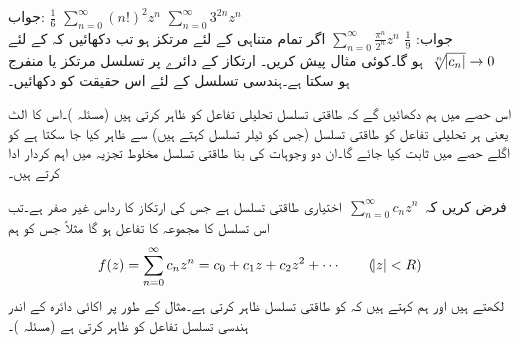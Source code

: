 جواب:\quad
$\tfrac{1}{6}$
\quad
$\sum\limits_{n=0}^{\infty} (n!)^2 z^n$
\quad
$\sum\limits_{n=0}^{\infty} 3^{2n}z^n$\\
جواب:\quad
$\tfrac{1}{9}$
\quad
$\sum\limits_{n=0}^{\infty} \tfrac{\pi^n}{2^n}z^n$
\quad
اگر  تمام متناہی  کے لئے مرتکز ہو تب دکھائیں کہ  کے لئے 
$\,\sqrt[\leftroot{-2}n]{\abs{c_n}}\to 0\,$
ہو گا۔کوئی مثال پیش کریں۔
\quad
ارتکاز کے دائرے پر تسلسل مرتکز یا منفرج ہو سکتا ہے۔ہندسی تسلسل کے لئے اس حقیقت کو دکھائیں۔

اس حصے میں ہم دکھائیں گے کہ طاقتی تسلسل تحلیلی تفاعل کو ظاہر کرتی ہیں (مسئلہ )۔اس کا الٹ یعنی ہر تحلیلی تفاعل کو طاقتی تسلسل (جس کو ٹیلر تسلسل کہتے ہیں) سے ظاہر کیا جا سکتا ہے کو اگلے حصے میں ثابت کیا جائے گا۔ان دو وجوہات کی بنا طاقتی تسلسل مخلوط تجزیہ میں اہم کردار ادا کرتے ہیں۔

فرض کریں کہ 
$\,\sum_{n=0}^{\infty}c_nz^n\,$
اختیاری طاقتی تسلسل ہے جس کی ارتکاز کا رداس  غیر صفر ہے۔تب اس تسلسل کا مجموعہ  کا تفاعل ہو گا مثلاً  جس کو ہم
\begin{align}\label{مساوات_ٹیلر_طاقتی_تسلسل_اور_تحلیلی_تفاعل_الف}
f(z)=\sum\limits_{n=0}^{\infty} c_nz^n =c_0+c_1z+c_2z^2+\cdots\quad\quad (\abs{z}<R)
\end{align}
لکھتے ہیں اور ہم کہتے ہیں کہ  کو طاقتی تسلسل ظاہر کرتی ہے۔مثال کے طور پر اکائی دائرہ  کے اندر  ہندسی تسلسل  تفاعل  کو ظاہر کرتی ہے (مسئلہ )۔

